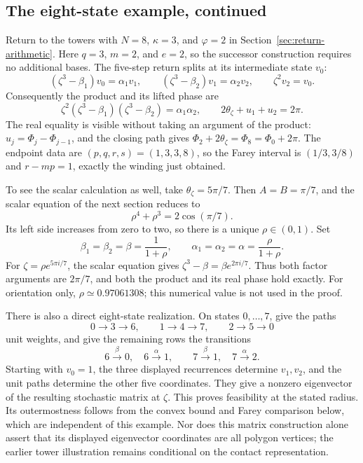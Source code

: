 \documentclass[11pt,a4paper]{article}
\theoremstyle{definition}
\theoremstyle{remark}
\numberwithin{equation}{section}
\begin{document}
\subsection*{The eight-state example, continued}
Return to the towers with $N=8$, $\kappa=3$, and $\varphi=2$ in
Section~\ref{sec:return-arithmetic}. Here $q=3$, $m=2$, and $e=2$,
so the successor construction requires no additional bases. The
five-step return splits at its intermediate state $v_0$:
\[
 (\zeta^3-\beta_1)v_0=\alpha_1v_1,\qquad
 (\zeta^3-\beta_2)v_1=\alpha_2v_2,\qquad
 \zeta^2v_2=v_0.
\]
Consequently the product and its lifted phase are
\[
 \zeta^2(\zeta^3-\beta_1)(\zeta^3-\beta_2)=\alpha_1\alpha_2,
 \qquad 2\theta_\zeta+u_1+u_2=2\pi.
\]
The real equality is visible without taking an argument of the
product: $u_j=\Phi_j-\Phi_{j-1}$, and the closing path gives
$\Phi_2+2\theta_\zeta=\Phi_8=\Phi_0+2\pi$.
The endpoint data are $(p,q,r,s)=(1,3,3,8)$, so the Farey interval is
$(1/3,3/8)$ and $r-mp=1$, exactly the winding just obtained.

To see the scalar calculation as well, take
$\theta_\zeta=5\pi/7$. Then $A=B=\pi/7$, and the scalar equation
of the next section reduces to
\[
 \rho^4+\rho^3=2\cos(\pi/7).
\]
Its left side increases from zero to two, so there is a unique
$\rho\in(0,1)$. Set
\[
 \beta_1=\beta_2=\beta=\frac1{1+\rho},\qquad
 \alpha_1=\alpha_2=\alpha=\frac{\rho}{1+\rho}.
\]
For $\zeta=\rho e^{5\pi i/7}$, the scalar equation gives
$\zeta^3-\beta=\beta e^{2\pi i/7}$. Thus both factor arguments
are $2\pi/7$, and both the product and its real phase hold exactly.
For orientation only, $\rho\simeq0.97061308$; this numerical value
is not used in the proof.

There is also a direct eight-state realization. On states $0,\ldots,7$,
give the paths
\[
 0\longrightarrow3\longrightarrow6,\qquad
 1\longrightarrow4\longrightarrow7,\qquad
 2\longrightarrow5\longrightarrow0
\]
unit weights, and give the remaining rows the transitions
\[
 6\xrightarrow{\beta}0,\quad6\xrightarrow{\alpha}1,
 \qquad
 7\xrightarrow{\beta}1,\quad7\xrightarrow{\alpha}2.
\]
Starting with $v_0=1$, the three displayed recurrences determine
$v_1,v_2$, and the unit paths determine the other five coordinates.
They give a nonzero eigenvector of the resulting stochastic matrix at $\zeta$.
This proves feasibility at the stated radius. Its outermostness
follows from the convex bound and Farey comparison below, which are
independent of this example. Nor does this matrix construction alone
assert that its displayed eigenvector coordinates are all polygon
vertices; the earlier tower illustration remains conditional on the
contact representation.
\end{document}

